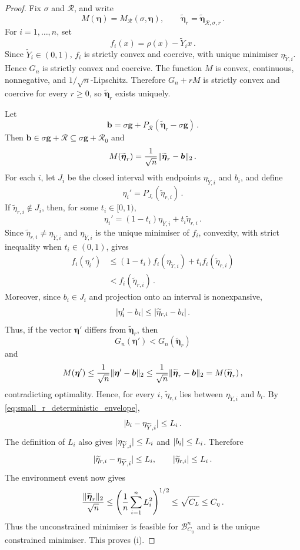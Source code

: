 \documentclass{article}
\makeatletter
\theoremstyle{definition}
\newcommand{\vnorm}[1]{%
	\ensuremath{%
		\if@display
		\left\| #1 \right\|
		\else
		\| #1 \|
		\fi
	}%
}
\newcommand{\abs}[1]{%
	\ensuremath{%
		\if@display
		\left| #1 \right|
		\else
		\lvert #1 \rvert
		\fi
	}%
}
\newcommand*{\bb}{\boldsymbol}
\def\bg{\bb{g}}
\def\Ytil{\widetilde{Y}}
\makeatother
\begin{document}
\begin{bibunit}
\begin{proof}
Fix $\sigma$ and $\mathcal R$, and write
$$
	M(\bb\eta)
	=
	M_{\mathcal R}(\sigma,\bb\eta),
	\qquad
	\widetilde{\bb\eta}_r
	=
	\widetilde{\bb\eta}_{\mathcal R,\sigma,r}\,.
$$
For $i=1,\ldots,n$, set
$$
	f_i(x)
	=
	\rho(x)-\Ytil_i x\,.
$$
Since $\Ytil_i\in(0,1)$, $f_i$ is strictly convex and coercive, with
unique minimiser $\eta_{\Ytil,i}$. Hence $G_n$ is strictly convex and
coercive. The function $M$ is convex, continuous, nonnegative, and
$1/\sqrt n$-Lipschitz. Therefore
$G_n+rM$ is strictly convex and coercive for every $r\geq0$, so
$\widetilde{\bb\eta}_r$ exists uniquely.

Let
$$
	\bb b
	=
	\sigma\bg
	+
	P_{\mathcal R}
	(\widetilde{\bb\eta}_r-\sigma\bg)\,.
$$
Then $\bb b\in\sigma\bg+\mathcal R\subseteq\sigma\bg+\mathcal R_0$ and
$$
	M(\widetilde{\bb\eta}_r)
	=
	\frac1{\sqrt n}
	\vnorm{\widetilde{\bb\eta}_r-\bb b}_2\,.
$$
For each $i$, let $J_i$ be the closed interval with endpoints
$\eta_{\Ytil,i}$ and $b_i$, and define
$$
	\eta_i'
	=
	P_{J_i}(\widetilde\eta_{r,i})\,.
$$
If $\widetilde\eta_{r,i}\notin J_i$, then, for some
$t_i\in[0,1)$,
$$
	\eta_i'
	=
	(1-t_i)\eta_{\Ytil,i}
	+
	t_i\widetilde\eta_{r,i}\,.
$$
Since $\widetilde\eta_{r,i}\neq\eta_{\Ytil,i}$ and
$\eta_{\Ytil,i}$ is the unique minimiser of $f_i$, convexity, with strict
inequality when $t_i\in(0,1)$, gives
$$
\begin{aligned}
	f_i(\eta_i')
	&\leq
	(1-t_i)f_i(\eta_{\Ytil,i})
	+
	t_i f_i(\widetilde\eta_{r,i})
	\\
	&<
	f_i(\widetilde\eta_{r,i})\,.
\end{aligned}
$$
Moreover, since $b_i\in J_i$ and projection onto an interval is
nonexpansive,
$$
	\abs{\eta_i'-b_i}
	\leq
	\abs{\widetilde\eta_{r,i}-b_i}\,.
$$
Thus, if the vector $\bb\eta'$ differs from
$\widetilde{\bb\eta}_r$, then
$$
	G_n(\bb\eta')
	<
	G_n(\widetilde{\bb\eta}_r)
$$
and
$$
	M(\bb\eta')
	\leq
	\frac1{\sqrt n}\vnorm{\bb\eta'-\bb b}_2
	\leq
	\frac1{\sqrt n}\vnorm{\widetilde{\bb\eta}_r-\bb b}_2
	=
	M(\widetilde{\bb\eta}_r)\,,
$$
contradicting optimality. Hence, for every $i$,
$\widetilde\eta_{r,i}$ lies between $\eta_{\Ytil,i}$ and $b_i$.
By \eqref{eq:small_r_deterministic_envelope},
$$
	\abs{b_i-\eta_{\Ytil,i}}
	\leq
	L_i\,.
$$
The definition of $L_i$ also gives
$\abs{\eta_{\Ytil,i}}\leq L_i$ and $\abs{b_i}\leq L_i$. Therefore
\begin{equation}
\label{eq:small_r_coordinate_envelope}
	\abs{
		\widetilde\eta_{r,i}-\eta_{\Ytil,i}
	}
	\leq
	L_i,
	\qquad
	\abs{\widetilde\eta_{r,i}}
	\leq
	L_i\,.
\end{equation}
The environment event now gives
$$
	\frac{\vnorm{\widetilde{\bb\eta}_r}_2}{\sqrt n}
	\leq
	\left(
		\frac1n\sum_{i=1}^nL_i^2
	\right)^{1/2}
	\leq
	\sqrt{C_L}
	\leq
	C_\eta\,.
$$
Thus the unconstrained minimiser is feasible for
$\mathcal B^n_{C_\eta}$ and is the unique constrained minimiser. This proves
(i).


\end{proof}
\end{bibunit}
\end{document}
